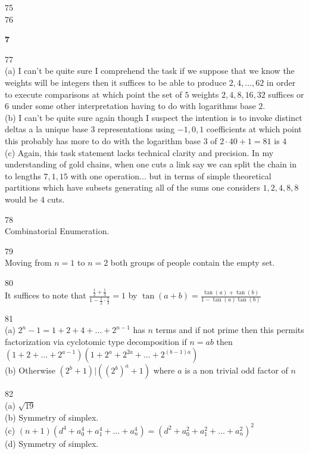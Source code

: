 75 \\


76 \\


\newpage

\textbf{7}

77 \\
(a) I can't be quite sure I comprehend the task if we suppose that we know the weights will be integers then it suffices to be able to produce $2,4,\dots,62$ in order to execute comparisons at which point the set of $5$ weights $2,4,8,16,32$ suffices or $6$ under some other interpretation having to do with logarithms base $2$. \\
(b) I can't be quite sure again though I suspect the intention is to invoke distinct deltas a la unique base $3$ representations using $-1,0,1$ coefficients at which point this probably has more to do with the logarithm base $3$ of $2\cdot 40+1=81$ is $4$ \\
(c) Again, this task statement lacks technical clarity and precision. In my understanding of gold chains, when one cuts a link say we can split the chain in to lengths $7,1,15$ with one operation... but in terms of simple theoretical partitions which have subsets generating all of the sums one considers $1,2,4,8,8$ would be $4$ cuts.

78 \\
Combinatorial Enumeration.

79 \\
Moving from $n=1$ to $n=2$ both groups of people contain the empty set.

80 \\
It suffices to note that $\frac{\frac{1}{2}+\frac{1}{3}}{1-\frac{1}{2}\cdot \frac{1}{3}}=1$ by $\tan(a+b)=\frac{\tan(a)+\tan(b)}{1-\tan(a)\tan(b)}$

81 \\
(a) $2^n-1=1+2+4+\dots+2^{n-1}$ has $n$ terms and if not prime then this permits factorization via cyclotomic type decomposition if $n=ab$ then $(1+2+\dots+2^{a-1})(1+2^a+2^{2a}+\dots+2^{(b-1)a})$ \\
(b) Otherwise $(2^b+1)|((2^b)^a+1)$ where $a$ is a non trivial odd factor of $n$

82 \\
(a) $\boxed{\sqrt{19}}$ \\
(b) Symmetry of simplex. \\
(c) $(n+1)(d^4+a_0^4+a_1^4+\dots+a_n^4)=(d^2+a_0^2+a_1^2+\dots+a_n^2)^2$ \\
(d) Symmetry of simplex.

